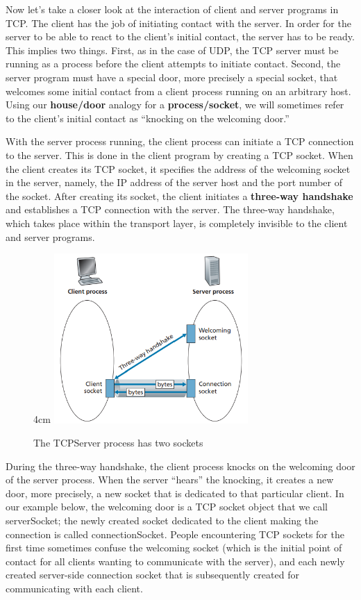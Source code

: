 \documentclass[a4paper,12pt]{book}
\begin{document}
Now let’s take a closer look at the interaction of client and server programs in TCP. The client has the job of initiating contact with the server. In order for the server to be able to react to the client’s initial contact, the server has to be ready. This implies two things. First, as in the case of UDP, the TCP server must be running as a process before the client attempts to initiate contact. Second, the server program must have a special door, more precisely a special socket, that welcomes some initial contact from a client process running on an arbitrary host. Using our \textbf{house/door} analogy for a \textbf{process/socket}, we will sometimes refer to the client’s initial contact as “knocking on the welcoming door.”

With the server process running, the client process can initiate a TCP connection to the server. This is done in the client program by creating a TCP socket. When the client creates its TCP socket, it specifies the address of the welcoming socket in the server, namely, the IP address of the server host and the port number of the socket. After creating its socket, the client initiates a \textbf{three-way handshake} and establishes a
TCP connection with the server. The three-way handshake, which takes place within the transport layer, is completely invisible to the client and server programs.

\begin{figure}{4cm}
\centering
\includegraphics[width=7.4cm]{./tcp-socket.PNG}
\caption{The TCPServer process has two sockets}\label{fig:tcpsocket}
\end{figure}

During the three-way handshake, the client process knocks on the welcoming door of the server process. When the server “hears” the knocking, it creates a new door, more precisely, a new socket that is dedicated to that particular client. In our example below, the welcoming door is a TCP socket object that we call serverSocket; the newly created socket dedicated to the client making the connection is called connectionSocket. People encountering TCP sockets for the first time sometimes confuse the welcoming socket (which is the initial
point of contact for all clients wanting to communicate with the server), and each newly created server-side connection socket that is subsequently created for communicating with each client.
\end{document}
